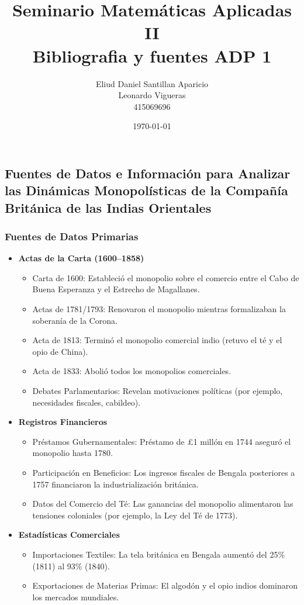 \documentclass[a4paper,12pt]{article}
\title{\textbf{Seminario Matemáticas Aplicadas II\\Bibliografia y fuentes ADP 1}}
\author{Eliud Daniel Santillan Aparicio \\ Leonardo Vigueras \\ 415069696}
\date{\today}
\begin{document}
\maketitle



\subsection*{Fuentes de Datos e Información para Analizar las Dinámicas Monopolísticas de la Compañía Británica de las Indias Orientales}

\subsubsection*{Fuentes de Datos Primarias}

\begin{itemize}
    \item \textbf{Actas de la Carta (1600–1858)}
    \begin{itemize}
        \item Carta de 1600: Estableció el monopolio sobre el comercio entre el Cabo de Buena Esperanza y el Estrecho de Magallanes\cite{ref4}.
        \item Actas de 1781/1793: Renovaron el monopolio mientras formalizaban la soberanía de la Corona\cite{ref1,ref5}.
        \item Acta de 1813: Terminó el monopolio comercial indio (retuvo el té y el opio de China)\cite{ref3,ref6}.
        \item Acta de 1833: Abolió todos los monopolios comerciales\cite{ref3,ref5}.
        \item Debates Parlamentarios: Revelan motivaciones políticas (por ejemplo, necesidades fiscales, cabildeo)\cite{ref1,ref5}.
    \end{itemize}
    \item \textbf{Registros Financieros}
    \begin{itemize}
        \item Préstamos Gubernamentales: Préstamo de £1 millón en 1744 aseguró el monopolio hasta 1780\cite{ref1}.
        \item Participación en Beneficios: Los ingresos fiscales de Bengala posteriores a 1757 financiaron la industrialización británica\cite{ref2,ref6}.
        \item Datos del Comercio del Té: Las ganancias del monopolio alimentaron las tensiones coloniales (por ejemplo, la Ley del Té de 1773)\cite{ref8}.
    \end{itemize}
    \item \textbf{Estadísticas Comerciales}
    \begin{itemize}
        \item Importaciones Textiles: La tela británica en Bengala aumentó del 25\% (1811) al 93\% (1840)\cite{ref2}.
        \item Exportaciones de Materias Primas: El algodón y el opio indios dominaron los mercados mundiales\cite{ref2,ref7}.
    \end{itemize}
\end{itemize}
\end{document}

